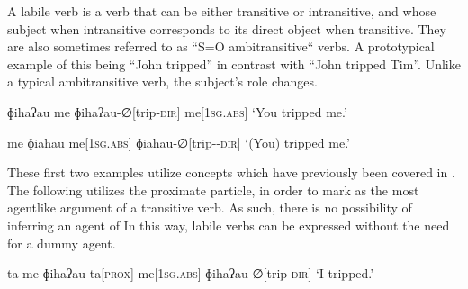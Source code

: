 A labile verb is a verb that can be either transitive or intransitive, and whose subject when intransitive corresponds to its direct object when transitive. They are also sometimes referred to as ``S=O ambitransitive`` verbs. A prototypical example of this being ``John tripped'' in contrast with ``John tripped Tim''. Unlike a typical ambitransitive verb, the subject's role changes.

\ex
\begingl
\glpreamble ɸihaʔau me
\endpreamble
ɸihaʔau-∅[trip\textsc{-dir}]
me[\textsc{1sg.abs}]
\glft `You tripped me.'
\endgl
\xe

\ex
\begingl
\glpreamble me ɸiahau
\endpreamble
me[\textsc{1sg.abs}]
ɸiahau-∅[trip-\textsc{-dir}]
\glft `(You) tripped me.'
\endgl
\xe

These first two examples utilize concepts which have previously been covered in . The following utilizes the proximate particle,  in order to mark  as the most agentlike argument of a transitive verb. As such, there is no possibility of inferring an agent of  In this way, labile verbs can be expressed without the need for a dummy agent.

\ex
\begingl
\glpreamble ta me ɸihaʔau
\endpreamble
ta[\textsc{prox}]
me[\textsc{1sg.abs}]
ɸihaʔau-∅[trip\textsc{-dir}]
\glft `I tripped.'
\endgl
\xe
